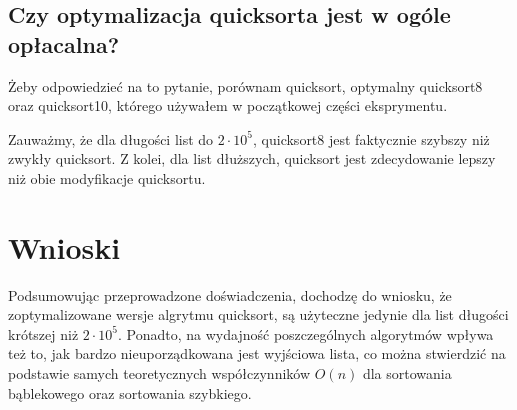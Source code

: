 \documentclass[12pt,a4paper]{article}
\begin{document}
\subsection*{Czy optymalizacja quicksorta jest w ogóle opłacalna?}
Żeby odpowiedzieć na to pytanie, porównam quicksort, optymalny quicksort8 oraz quicksort10, którego używałem w początkowej części eksprymentu.
\begin{figure}[H]
  \begin{center}
  \end{center}
\end{figure}
Zauważmy, że dla długości list do $2\cdot10^5$, quicksort8 jest faktycznie szybszy niż zwykły quicksort. Z kolei, dla list dłuższych, quicksort jest zdecydowanie lepszy niż obie modyfikacje quicksortu.
\section{Wnioski}
Podsumowując przeprowadzone doświadczenia, dochodzę do wniosku, że zoptymalizowane wersje algrytmu quicksort, są użyteczne jedynie dla list długości krótszej niż $2\cdot10^5$. Ponadto, na wydajność poszczególnych algorytmów wpływa też to, jak bardzo nieuporządkowana jest wyjściowa lista, co można stwierdzić na podstawie samych teoretycznych współczynników $O(n)$ dla sortowania bąblekowego oraz sortowania szybkiego.
\end{document}
